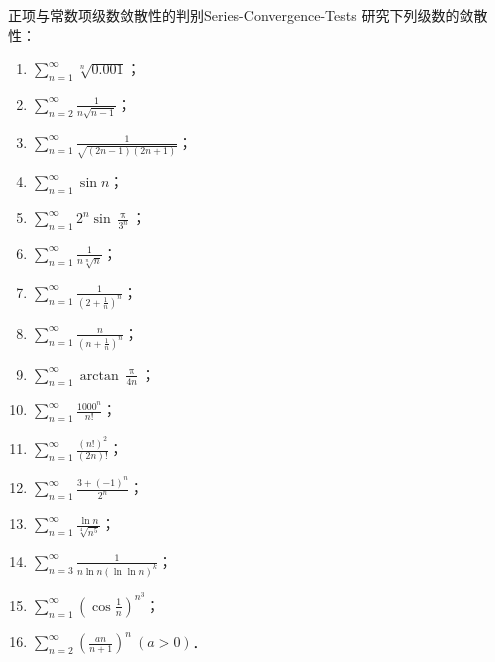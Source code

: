 \begin{problem}{正项与常数项级数敛散性的判别}{Series-Convergence-Tests}
    研究下列级数的敛散性：
    \begin{enumerate}
        \item $\sum_{n=1}^\infty \sqrt[n]{0.001}$；
        \item $\sum_{n=2}^\infty \frac{1}{n\sqrt{n-1}}$；
        \item $\sum_{n=1}^\infty \frac{1}{\sqrt{(2n-1)(2n+1)}}$；
        \item $\sum_{n=1}^\infty \sin n$；
        \item $\sum_{n=1}^\infty 2^n \sin \frac{\uppi}{3^n}$；
        \item $\sum_{n=1}^\infty \frac{1}{n\sqrt[n]{n}}$；
        \item $\sum_{n=1}^\infty \frac{1}{(2 + \frac{1}{n})^n}$；
        \item $\sum_{n=1}^\infty \frac{n}{(n + \frac{1}{n})^n}$；
        \item $\sum_{n=1}^\infty \arctan \frac{\uppi}{4n}$；
        \item $\sum_{n=1}^\infty \frac{1000^n}{n!}$；
        \item $\sum_{n=1}^\infty \frac{(n!)^2}{(2n)!}$；
        \item $\sum_{n=1}^\infty \frac{3 + (-1)^n}{2^n}$；
        \item $\sum_{n=1}^\infty \frac{\ln n}{\sqrt[4]{n^5}}$；
        \item $\sum_{n=3}^\infty \frac{1}{n \ln n (\ln\ln n)^k}$；
        \item $\sum_{n=1}^\infty \left(\cos \frac{1}{n}\right)^{n^3}$；
        \item $\sum_{n=2}^\infty \left(\frac{an}{n+1}\right)^n \ (a > 0)$．
    \end{enumerate}
\end{problem}

